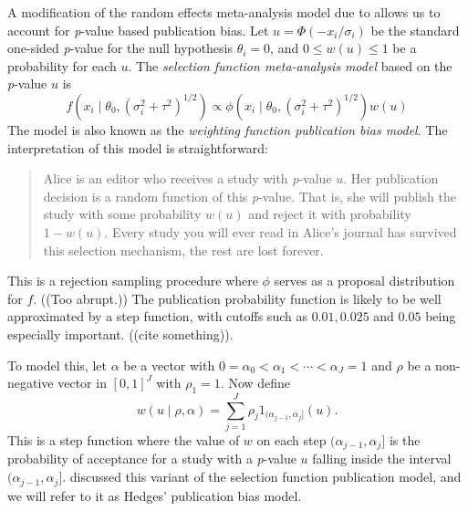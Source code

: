 \documentclass[twoside]{article}
\begin{document}
A modification of the random effects meta-analysis model due to \citet{hedges1984estimation}
allows us to account for \textit{p}-value based publication bias. Let $u=\Phi(-x_{i}/\sigma_{i})$ be the standard one-sided
\textit{p}-value for the null hypothesis $\theta_{i}=0$, and $0\leq w(u)\leq 1$ be
a probability for each $u$. The \textit{selection function meta-analysis
model} \citep{hedges1984estimation,hedges1992modeling} based on
the \emph{p}-value $u$ is
\begin{equation}
f(x_{i}\mid\theta_{0},(\sigma_{i}^{2}+\tau^{2})^{1/2})\propto\phi(x_{i}\mid\theta_{0},(\sigma_{i}^{2}+\tau^{2})^{1/2})w(u)\label{eq:Publication bias model}
\end{equation}
The model is also known as the \textit{weighting function publication bias
model}. The interpretation of this model is straightforward:
\begin{quote}
Alice is an editor who receives a study with \textit{p}-value $u$.
Her publication decision is a random function of this \textit{p}-value. That is, 
she will publish the study with some probability $w(u)$ and reject it with probability $1-w(u)$.
Every study you will ever read in Alice's journal has survived this
selection mechanism, the rest are lost forever.
\end{quote}

This is a rejection sampling procedure \citep{von1951various,flury1990acceptance} where $\phi$ serves as a proposal distribution for $f$. ((Too abrupt.)) The publication probability function is likely to be well approximated by a step function, with cutoffs such as $0.01,0.025$
and $0.05$ being especially important. ((cite something)). 

To model this, let $\alpha$
be a vector with $0=\alpha_{0}<\alpha_{1}<\cdots<\alpha_{J}=1$ and
$\rho$ be a non-negative vector in $[0,1]^{J}$ with $\rho_{1}=1$.
Now define 
\begin{equation}
w(u\mid\rho,\alpha)=\sum_{j=1}^{J}\rho_{j}1_{(\alpha_{j-1},\alpha_{j}]}(u).
\end{equation}
This is a step function where the value of $w$ on each step $(\alpha_{j-1},\alpha_{j}]$
is the probability of acceptance for a study with a \textit{p}-value
$u$ falling inside the interval $(\alpha_{j-1},\alpha_{j}]$. \citet{hedges1992modeling} discussed this variant of the selection function publication model, and we will refer to it as Hedges' publication bias model. %
\end{document}
